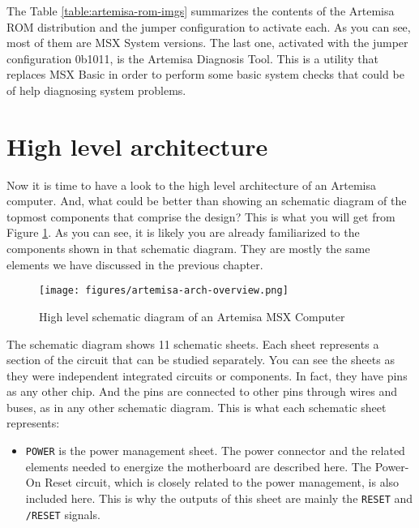 The Table \ref{table:artemisa-rom-imgs} summarizes the contents of the Artemisa ROM distribution and the jumper configuration to activate each. As you can see, most of them are MSX System versions. The last one, activated with the jumper configuration 0b1011, is the Artemisa Diagnosis Tool. This is a utility that replaces MSX Basic in order to perform some basic system checks that could be of help diagnosing system problems.

\section{High level architecture}

Now it is time to have a look to the high level architecture of an Artemisa computer. And, what could be better than showing an schematic diagram of the topmost components that comprise the design? This is what you will get from Figure \ref{fig:artemisa-arch-overview}. As you can see, it is likely you are already familiarized to the components shown in that schematic diagram. They are mostly the same elements we have discussed in the previous chapter.

\begin{figure}
  \centering
  \texttt{[image: figures/artemisa-arch-overview.png]}
  \caption{High level schematic diagram of an Artemisa MSX Computer}
  \label{fig:artemisa-arch-overview}
\end{figure}

The schematic diagram shows 11 schematic sheets. Each sheet represents a section of the circuit that can be studied separately. You can see the sheets as they were independent integrated circuits or components. In fact, they have pins as any other chip. And the pins are connected to other pins through wires and buses, as in any other schematic diagram. This is what each schematic sheet represents:

\begin{itemize}
  \item {\tt POWER} is the power management sheet. The power connector and the related elements needed to energize the motherboard are described here. The Power-On Reset circuit, which is closely related to the power management, is also included here. This is why the outputs of this sheet are mainly the {\tt RESET} and {\tt /RESET} signals.
\end{itemize}

